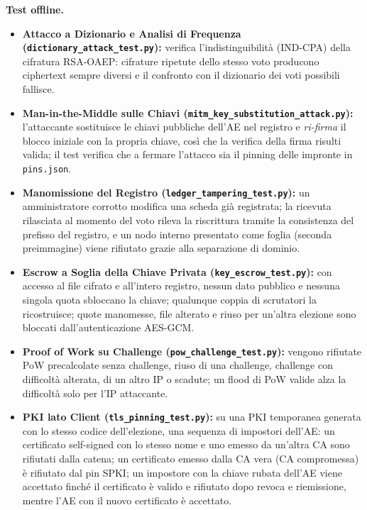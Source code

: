 \documentclass[12pt,a4paper]{article}
\begin{document}
\textbf{Test offline.}
\begin{itemize}
  \item \textbf{Attacco a Dizionario e Analisi di Frequenza (\texttt{dictionary\_attack\_test.py}):} verifica l'indistinguibilità (IND-CPA) della cifratura RSA-OAEP: cifrature ripetute dello stesso voto producono ciphertext sempre diversi e il confronto con il dizionario dei voti possibili fallisce.
  \item \textbf{Man-in-the-Middle sulle Chiavi (\texttt{mitm\_key\_}\allowbreak\texttt{substitution\_attack.py}):} l'attaccante sostituisce le chiavi pubbliche dell'AE nel registro e \emph{ri-firma} il blocco iniziale con la propria chiave, così che la verifica della firma risulti valida; il test verifica che a fermare l'attacco sia il pinning delle impronte in \texttt{pins.json}.
  \item \textbf{Manomissione del Registro (\texttt{ledger\_tampering\_test.py}):} un amministratore corrotto modifica una scheda già registrata; la ricevuta rilasciata al momento del voto rileva la riscrittura tramite la consistenza del prefisso del registro, e un nodo interno presentato come foglia (seconda preimmagine) viene rifiutato grazie alla separazione di dominio.
  \item \textbf{Escrow a Soglia della Chiave Privata (\texttt{key\_escrow\_test.py}):} con accesso al file cifrato e all'intero registro, nessun dato pubblico e nessuna singola quota sbloccano la chiave; qualunque coppia di scrutatori la ricostruisce; quote manomesse, file alterato e riuso per un'altra elezione sono bloccati dall'autenticazione AES-GCM.
  \item \textbf{Proof of Work su Challenge (\texttt{pow\_challenge\_test.py}):} vengono rifiutate PoW precalcolate senza challenge, riuso di una challenge, challenge con difficoltà alterata, di un altro IP o scadute; un flood di PoW valide alza la difficoltà solo per l'IP attaccante.
  \item \textbf{PKI lato Client (\texttt{tls\_pinning\_test.py}):} su una PKI temporanea generata con lo stesso codice dell'elezione, una sequenza di impostori dell'AE: un certificato self-signed con lo stesso nome e uno emesso da un'altra CA sono rifiutati dalla catena; un certificato emesso dalla CA vera (CA compromessa) è rifiutato dal pin SPKI; un impostore con la chiave rubata dell'AE viene accettato finché il certificato è valido e rifiutato dopo revoca e riemissione, mentre l'AE con il nuovo certificato è accettato.
\end{itemize}
\end{document}
